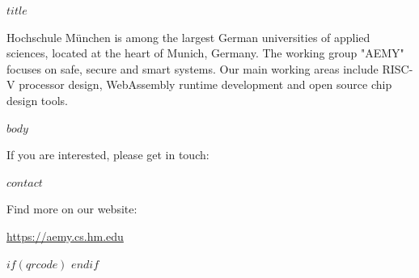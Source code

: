 \documentclass[a4,14pt]{scrreprt}
\begin{document}
\par
{}%
\hfill
{}%
\par

\pagestyle{empty}

\vspace{1cm}

\begin{center}
\begin{minipage}[t]{.9\textwidth}
  \centering
{\Huge \textbf{$title$}}
\end{minipage}
\end{center}

\vspace{1cm}

Hochschule München is among the largest German universities of applied sciences,
located at the heart of Munich, Germany. The working group "AEMY" focuses on
safe, secure and smart systems. Our main working areas include RISC-V processor
design, WebAssembly runtime development and open source chip design tools.

$body$

\vfill

\begin{minipage}[t]{.6\textwidth}\vspace{0pt}
  If you are interested, please get in touch:
  
  $contact$

  Find more on our website:
  
  \url{https://aemy.cs.hm.edu}
\end{minipage}
\hfill
\begin{minipage}[t]{.25\textwidth}\vspace{0pt}
\hfill $if(qrcode)$  $endif$
\end{minipage}
\end{document}

